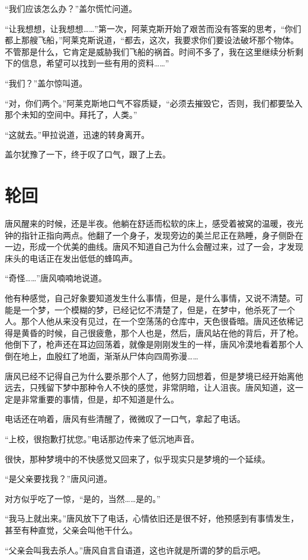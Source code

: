 “我们应该怎么办？”盖尔慌忙问道。 

“让我想想，让我想想……”第一次，阿莱克斯开始了艰苦而没有答案的思考，“你们都上那艘飞船，”阿莱克斯说道，“都去，这次，我要求你们要设法破坏那个物体。不管那是什么，它肯定是威胁我们飞船的祸首。时间不多了，我在这里继续分析剩下的信息，希望可以找到一些有用的资料……” 

“我们？”盖尔惊叫道。 

“对，你们两个。”阿莱克斯地口气不容质疑，“必须去摧毁它，否则，我们都要坠入那个未知的空间中。拜托了，人类。” 

“这就去。”甲拉说道，迅速的转身离开。 

盖尔犹豫了一下，终于叹了口气，跟了上去。 

\chapter{轮回}

唐风醒来的时候，还是半夜。他躺在舒适而松软的床上，感受着被窝的温暖，夜光钟的指针正指向两点。他翻了一个身子，发现旁边的美兰尼正在熟睡，身子侧卧在一边，形成一个优美的曲线。唐风不知道自己为什么会醒过来，过了一会，才发现床头的电话正在发出低低的蜂鸣声。 

“奇怪……”唐风喃喃地说道。 

他有种感觉，自己好象要知道发生什么事情，但是，是什么事情，又说不清楚。可能是一个梦，一个模糊的梦，已经记忆不清楚了，但是，在梦中，他杀死了一个人。那个人他从来没有见过，在一个空荡荡的仓库中，天色很昏暗。唐风还依稀记得是黄昏的时候，自己很疲惫，那个人也是，然后，唐风站在他的背后，开了枪。他倒下了，枪声还在耳边回荡着，就像是刚刚发生的一样，唐风冷漠地看着那个人倒在地上，血殷红了地面，渐渐从尸体向四周弥漫…… 

唐风已经不记得自己为什么要杀那个人了，他努力回想着，但是梦境已经开始离他远去，只残留下梦中那种令人不快的感觉，非常阴暗，让人沮丧。唐风知道，这一定是非常重要的事情，但是，却不知道是什么。 

电话还在响着，唐风有些清醒了，微微叹了一口气，拿起了电话。 

“上校，很抱歉打扰您。”电话那边传来了低沉地声音。 

很快，那种梦境中的不快感觉又回来了，似乎现实只是梦境的一个延续。 

“是父亲要找我？”唐风问道。 

对方似乎吃了一惊，“是的，当然……是的。” 

“我马上就出来。”唐风放下了电话，心情依旧还是很不好，他预感到有事情发生，甚至有种直觉，父亲会叫他干什么。 

“父亲会叫我去杀人。”唐风自言自语道，这也许就是所谓的梦的启示吧。 

